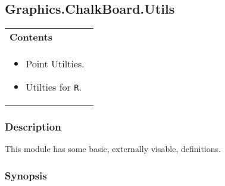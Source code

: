 \subsection{Graphics.ChalkBoard.Utils}     

         

 

 
\begin{tabular}{p{0.95\linewidth}}{\bf {\bf Contents}}\\ %

 
\begin{itemize}
\setlength{\itemsep}{0in}

\item Point Utilties.
\item Utilties for {\tt R}.
\end{itemize}
\\ %


\end{tabular}


 

\subsubsection{Description}

\hspace{0.05\textwidth}\begin{minipage}{0.9\textwidth}This module has some basic, externally visable, definitions.\end{minipage}

 

\subsubsection{Synopsis}

 

